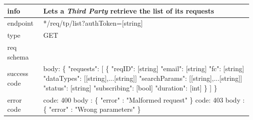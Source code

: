 \documentclass[titlepage]{article}
\begin{document}
\begin{tabularx}{\textwidth}{lX} \hline
    info & Lets a {\it Third Party} retrieve the list of its requests \\ \hline
    endpoint & */req/tp/list?authToken=[string] \\ \hline
    type & GET \\ \hline
    req schema & \\ \hline
    success code & body: \{ \newline
    "requests": [ \newline
    \{ \newline
    "reqID": [string] \newline
    "email": [string] \newline
    "fc": [string] \newline
    "dataTypes": [[string],...[string]] \newline
    "searchParams": [[string],...[string]] \newline
    "status": [string] \newline
    "subscribing": [bool] \newline
    "duration": [int] \newline
    \} \newline
    ] \newline
    \} \\ \hline
    error code &
        code: 400 \newline
        body : \{ "error" : "Malformed request" \} \newline \newline
        code: 403 \newline
        body : \{ "error" : "Wrong parameters" \}\\ \hline
\end{tabularx}
		
\vspace{\baselineskip}
\end{document}
